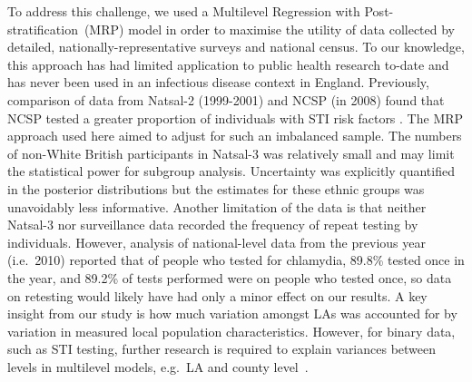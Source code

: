 \documentclass[fleqn,10pt]{wlscirep}
\begin{document}
To address this challenge, we used a Multilevel Regression with Post-stratification~(MRP) model in order to maximise the utility of data collected by detailed, nationally-representative surveys and national census. To our knowledge, this approach has had limited application to public health research to-date \cite{Zhang2013, Wang2018} and has never been used in an infectious disease context in England. Previously, comparison of data from Natsal-2 (1999-2001) and NCSP (in 2008) found that NCSP tested a greater proportion of individuals with STI risk factors \cite{Riha2011}. The MRP approach used here aimed to adjust for such an imbalanced sample. The numbers of non-White British participants in Natsal-3 was relatively small and may limit the statistical power for subgroup analysis. Uncertainty was explicitly quantified in the posterior distributions but the estimates for these ethnic groups was unavoidably less informative. Another limitation of the data is that neither Natsal-3 nor surveillance data recorded the frequency of repeat testing by individuals. However, analysis of national-level data from the previous year (i.e.\ 2010) \cite{Woodhall2013} reported that of people who tested for chlamydia, 89.8\% tested once in the year, and 89.2\% of tests performed were on people who tested once, so data on retesting would likely have had only a minor effect on our results. A key insight from our study is how much variation amongst LAs was accounted for by variation in measured local population characteristics. However, for binary data, such as STI testing, further research is required to explain variances between levels in multilevel models, e.g.\ LA and county level~\cite{Gelman2006}.
\end{document}
